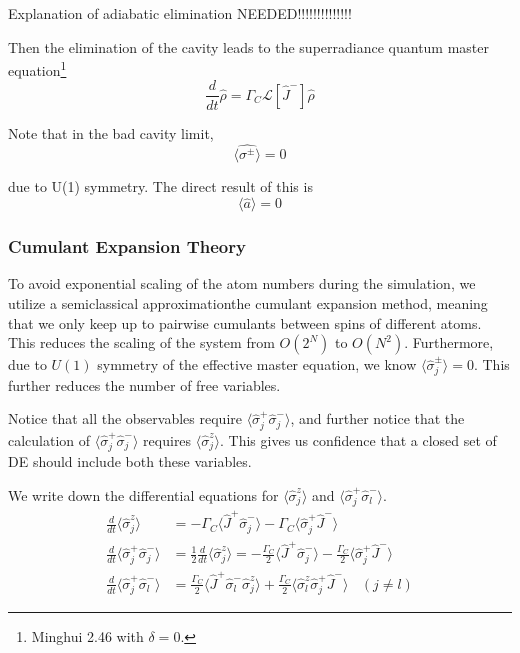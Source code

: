 \documentclass{article}
\newcommand{\gc}{\Gamma_C}
\newcommand{\lindblad}{\mathcal{L}}
\begin{document}
Explanation of adiabatic elimination NEEDED!!!!!!!!!!!!!!

Then the elimination of the cavity leads to the superradiance quantum master equation\footnote{Minghui 2.46 with $\delta=0$.}
\begin{equation}
\frac{d}{dt}\hat{\rho}=\gc\lindblad[\hat{J}^-]\hat{\rho}
\end{equation}

Note that in the bad cavity limit, 
\begin{equation}
    \langle \hat{\sigma^\pm} \rangle=0
\end{equation}

due to U(1) symmetry. The direct result of this is 
\begin{equation}
    \langle \hat{a} \rangle=0
\end{equation}

\subsubsection{Cumulant Expansion Theory}
To avoid exponential scaling of the atom numbers during the simulation, we utilize a semiclassical approximation\textemdash the cumulant expansion method, meaning that we only keep up to pairwise cumulants between spins of different atoms. This reduces the scaling of the system from $O(2^N)$ to $O(N^2)$. Furthermore, due to $U(1)$ symmetry of the effective master equation, we know $\langle\hat{\sigma}^\pm_j\rangle=0$. This further reduces the number of free variables.


Notice that all the observables require $\langle\hat{\sigma}^+_j\hat{\sigma}^-_j\rangle$, and further notice that the calculation of $\langle\hat{\sigma}^+_j\hat{\sigma}^-_j\rangle$ requires $\langle\hat{\sigma}^z_j\rangle$. This gives us confidence that a closed set of DE should include both these variables. 

We write down the differential equations for $\langle\hat{\sigma}^z_j\rangle$ and $\langle\hat{\sigma}^+_j\hat{\sigma}^-_l\rangle$. 
\begin{align}
\label{de01}
\frac{d}{dt}\langle\hat{\sigma}^z_j\rangle&=-\gc\langle\hat{J}^+\hat{\sigma}^-_j\rangle-\gc\langle\hat{\sigma}_j^+\hat{J}^-\rangle\\
\label{de02}
\frac{d}{dt}\langle\hat{\sigma}^+_j\hat{\sigma}^-_j\rangle&=\frac{1}{2}\frac{d}{dt}\langle\hat{\sigma}^z_j\rangle=-\frac{\gc}{2}\langle\hat{J}^+\hat{\sigma}^-_j\rangle-\frac{\gc}{2}\langle\hat{\sigma}_j^+\hat{J}^-\rangle\\
\label{de03}
\frac{d}{dt}\langle\hat{\sigma}^+_j\hat{\sigma}^-_l\rangle&=\frac{\gc}{2}\langle \hat{J}^+\hat{\sigma}^-_l\hat{\sigma}^z_j\rangle+ \frac{\gc}{2}\langle \hat{\sigma}^z_l\hat{\sigma}^+_j\hat{J}^-\rangle\ \ \ \ (j\neq l)
\end{align}
\end{document}
